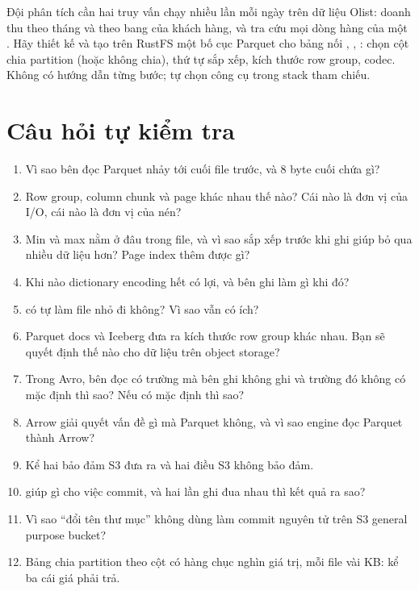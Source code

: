 \begin{thuthach}
Đội phân tích cần hai truy vấn chạy nhiều lần mỗi ngày trên dữ liệu Olist: doanh thu theo tháng và theo bang của khách hàng, và tra cứu mọi dòng hàng của một . Hãy thiết kế và tạo trên RustFS một bố cục Parquet cho bảng nối , , : chọn cột chia partition (hoặc không chia), thứ tự sắp xếp, kích thước row group, codec. Không có hướng dẫn từng bước; tự chọn công cụ trong stack tham chiếu.
\end{thuthach}

\section{Câu hỏi tự kiểm tra}
\begin{enumerate}
  \item Vì sao bên đọc Parquet nhảy tới cuối file trước, và 8 byte cuối chứa gì?
  \item Row group, column chunk và page khác nhau thế nào? Cái nào là đơn vị của I/O, cái nào là đơn vị của nén?
  \item Min và max nằm ở đâu trong file, và vì sao sắp xếp trước khi ghi giúp bỏ qua nhiều dữ liệu hơn? Page index thêm được gì?
  \item Khi nào dictionary encoding hết có lợi, và bên ghi làm gì khi đó?
  \item {} có tự làm file nhỏ đi không? Vì sao vẫn có ích?
  \item Parquet docs và Iceberg đưa ra kích thước row group khác nhau. Bạn sẽ quyết định thế nào cho dữ liệu trên object storage?
  \item Trong Avro, bên đọc có trường mà bên ghi không ghi và trường đó không có mặc định thì sao? Nếu có mặc định thì sao?
  \item Arrow giải quyết vấn đề gì mà Parquet không, và vì sao engine đọc Parquet thành Arrow?
  \item Kể hai bảo đảm S3 đưa ra và hai điều S3 không bảo đảm.
  \item {} giúp gì cho việc commit, và hai lần ghi đua nhau thì kết quả ra sao?
  \item Vì sao ``đổi tên thư mục'' không dùng làm commit nguyên tử trên S3 general purpose bucket?
  \item Bảng chia partition theo cột có hàng chục nghìn giá trị, mỗi file vài KB: kể ba cái giá phải trả.
\end{enumerate}

